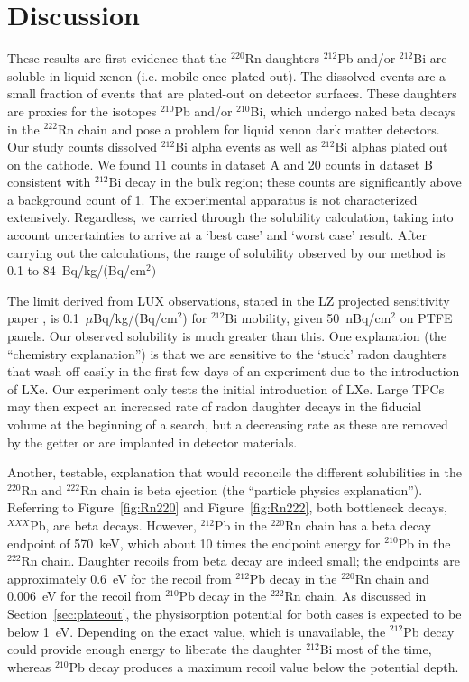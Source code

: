 \section{Discussion}
These results are first evidence that the $^{220}$Rn daughters $^{212}$Pb and/or $^{212}$Bi are soluble in liquid xenon (i.e. mobile once plated-out). The dissolved events are a small fraction of events that are plated-out on detector surfaces. These daughters are proxies for the isotopes $^{210}$Pb and/or $^{210}$Bi, which undergo naked beta decays in the $^{222}$Rn chain and pose a problem for liquid xenon dark matter detectors. Our study counts dissolved $^{212}$Bi alpha events as well as $^{212}$Bi alphas plated out on the cathode. We found 11 counts in dataset A and 20 counts in dataset B consistent with $^{212}$Bi decay in the bulk region; these counts are significantly above a background count of 1. The experimental apparatus is not characterized extensively. Regardless, we carried through the solubility calculation, taking into account uncertainties to arrive at a `best case' and `worst case' result. After carrying out the calculations, the range of solubility observed by our method is 0.1 to 84~Bq/kg/(Bq/cm$^{2})$

The limit derived from \ac{LUX} observations, stated in the \ac{LZ} projected sensitivity paper \cite{LZ:Sensitivity}, is 0.1~$\mu$Bq/kg/(Bq/cm$^{2}$) for $^{212}$Bi mobility, given 50~nBq/cm$^{2}$ on \ac{PTFE} panels. Our observed solubility is much greater than this. One explanation (the ``chemistry explanation'')  is that we are sensitive to the `stuck' radon daughters that wash off easily in the first few days of an experiment due to the introduction of \ac{LXe}. Our experiment only tests the initial introduction of \ac{LXe}. Large \ac{TPC}s may then expect an increased rate of radon daughter decays in the fiducial volume at the beginning of a search, but a decreasing rate as these are removed by the getter or are implanted in detector materials. 

Another, testable, explanation that would reconcile the different solubilities in the $^{220}$Rn and $^{222}$Rn chain is beta ejection (the ``particle physics explanation''). Referring to Figure~\ref{fig:Rn220} and Figure~\ref{fig:Rn222}, both bottleneck decays, $^{XXX}$Pb, are beta decays. However, $^{212}$Pb in the $^{220}$Rn chain has a beta decay endpoint of 570~keV, which about 10 times the endpoint energy for $^{210}$Pb in the $^{222}$Rn chain. Daughter recoils from beta decay are indeed small; the endpoints are approximately 0.6~eV for the recoil from $^{212}$Pb decay in the $^{220}$Rn chain and  0.006~eV for the recoil from $^{210}$Pb decay in the $^{222}$Rn chain. As discussed in Section~\ref{sec:plateout}, the physisorption potential for both cases is expected to be below 1~eV. Depending on the exact value, which is unavailable, the $^{212}$Pb decay could provide enough energy to liberate the daughter $^{212}$Bi most of the time, whereas $^{210}$Pb decay produces a maximum recoil value below the potential depth. 

